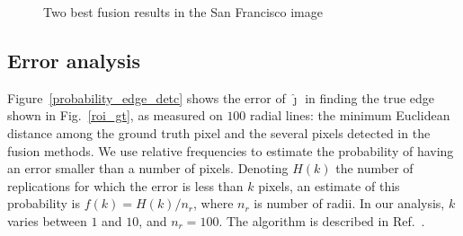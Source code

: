 \documentclass[journal]{IEEEtran}
\begin{document}
\begin{figure}[hbt]
	\centering
	\caption{Two best fusion results in the San Francisco image}
	\label{fusion_sf_met}
\end{figure}

\subsection{Error analysis}

Figure~\ref{probability_edge_detc} shows the error of $\widehat\jmath$ in finding the true edge shown in Fig.~\ref{roi_gt}, as measured on $100$ radial lines: the minimum Euclidean distance among the ground truth pixel and the several pixels detected in the fusion methods.
We use relative frequencies to estimate the probability of having an error smaller than a number of pixels. 
Denoting $H(k)$ the number of replications for which the error is less than $k$ pixels, an estimate of this probability is $f(k)={H(k)}/{n_r}$, where $n_r$ is number of radii. 
In our analysis, $k$ varies between $1$ and $10$, and $n_r=100$. 
The algorithm is described in Ref.~\cite{fbgm}.
\end{document}
